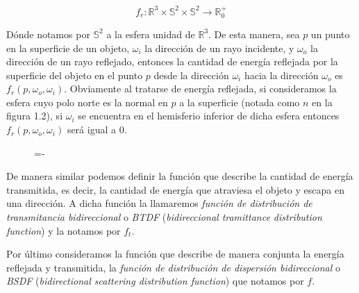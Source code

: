 $$f_r:\mathds{R}^3\times \mathds{S}^2 \times \mathds{S}^2 \rightarrow \mathds{R}^+_0$$

Dónde notamos por $\mathds{S}^2$ a la esfera unidad de $\mathds{R}^3$. De esta manera, sea $p$ un punto en la superficie de un objeto, $\omega _i$ la dirección de un rayo incidente, y $\omega _o$ la dirección de un rayo reflejado, entonces la cantidad de energía reflejada por la superficie del objeto en el punto $p$ desde la dirección $\omega _i$ hacia la dirección $\omega _o$ es $f_r(p,\omega _o, \omega _i)$. Obviamente al tratarse de energía reflejada, si consideramos la esfera cuyo polo norte es la normal en $p$ a la superficie (notada como $n$ en la figura 1.2), si $\omega _i$ se encuentra en el hemisferio inferior de dicha esfera entonces $f_r(p,\omega _o, \omega _i)$ será igual a 0.\\

\begin{figure}[h]
  \lineskip=-\fboxrule
\end{figure}

De manera similar podemos definir la función que describe la cantidad de energía transmitida, es decir, la cantidad de energía que atraviesa el objeto y escapa en una dirección. A dicha función la llamaremos \emph{función de distribución de transmitancia bidireccional} o \emph{BTDF} (\emph{bidireccional tramittance distribution function}) y la notamos por $f_t$.

Por último consideramos la función que describe de manera conjunta la energía reflejada y transmitida, la \emph{función de distribución de dispersión bidireccional} o \emph{BSDF} (\emph{bidirectional scattering distribution function}) que notamos por $f$.

